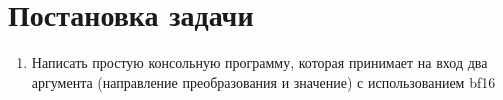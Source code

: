 \section{Постановка задачи}

\begin{enumerate}
	\item Написать простую консольную программу, которая принимает на вход два аргумента (направление преобразования и значение) с использованием bf16
\end{enumerate}